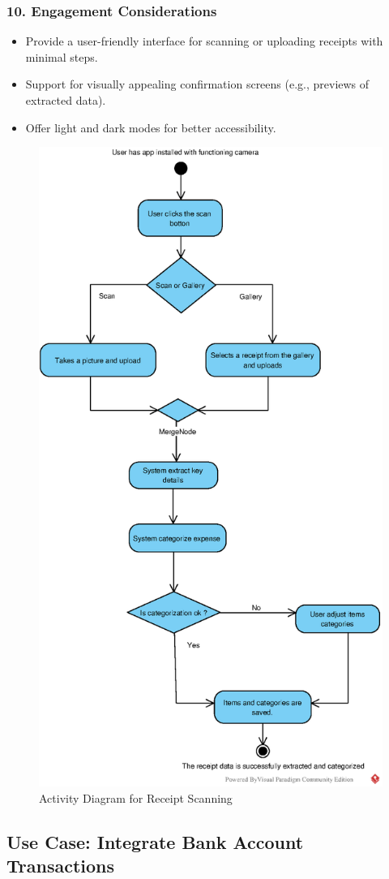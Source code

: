 \subsubsection*{10. Engagement Considerations}
\begin{itemize}
    \item Provide a user-friendly interface for scanning or uploading receipts with minimal steps.
    \item Support for visually appealing confirmation screens (e.g., previews of extracted data).
    \item Offer light and dark modes for better accessibility.
\end{itemize}

\newpage

\begin{figure}[!h]
    \centering
    \includegraphics[width=0.5\linewidth]{eps/ReceiptScanning.eps}
    \caption{Activity Diagram for Receipt Scanning}
    \label{fig:receiptScanning}
\end{figure}
\newpage


\subsection*{Use Case: Integrate Bank Account Transactions}
\begin{useCase}
\end{useCase}

